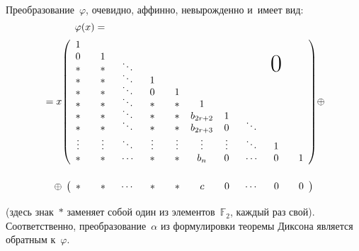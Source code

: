\begin{multicols}{2}
Преобразование~$\varphi$, очевидно, аффинно, невырожденно и~имеет вид:
$$    \hspace*{-33mm}\varphi(x) ={}\hspace*{33mm}
$$
\begin{equation*}
      \begin{split}
    {}=
    x &
    {
      \begin{pmatrix}
\makebox[1.5em]{$1$} &\rule{1.5em}{0pt} & \rule{1.5em}{0pt}   & 
\rule{1.5em}{0pt}   & \rule{1.5em}{0pt}   &  & \rule{1.5em}{0pt}   & 
\rule{1.5em}{0pt}   & \rule{1.5em}{0pt}   &  \rule{1.5em}{0pt}   \\
        0 & 1 &   &   &   &   &   &   &   &   \\
        * & * &\smash[t]{\ddots}&&   &   &   &   & 
\smash[t]{\mbox{\Huge{$0$}}}  &   \\
        * & * & \smash[t]{\ddots}  & 1 &   &   &   &   &   &      \\
        * & * &\smash[t]{\ddots}   & 0 & 1 &   &   &   &   &      \\
        * & * &\smash[t]{\ddots}   & * & * & 1 &   &   &   &   \\
        * & * &\smash[t]{\ddots}   & * & * & \makebox[1.5em]{$b_{2r+2}$}  & 1 &   &  &     \\
        * & * & \smash[t]{\ddots}  & * & * & \makebox[1.5em]{$b_{2r+3}$}  & 0 
&\smash[t]{\ddots}&& \\
        \vdots  &\vdots   & \smash[t]{\ddots}  &\vdots   &\vdots   & \vdots  & \vdots  &\ddots& 
1 &     \\
        * & * &\cdots   & * & * &b_n& 0 &\cdots & 0 & 1\\
      \end{pmatrix}} \oplus \\
   \oplus &
      \;\begin{pmatrix}
      \makebox[1.5em]{$*$}&\makebox[1.5em]{$*$}&\makebox[1.5em]{$\cdots$}&\makebox[1.5
em]{$*$}&\makebox[1.5em]{$*$}&\makebox[1.5em]{$c$}&\makebox[1.5em]{$0$}&\makebox
[1.5em]{$\cdots$}&\makebox[1.5em]{$0$}&\makebox[1.5em]{$0$} \\
      \end{pmatrix}
  \end{split}
\end{equation*}
(здесь знак~$*$ заменяет собой один из элементов~$\mathbb{F}_2$, каждый раз 
свой). Соответственно, преобразование~$\alpha$ из формулировки теоремы Диксона 
является обратным к~$\varphi$.


\end{multicols}
